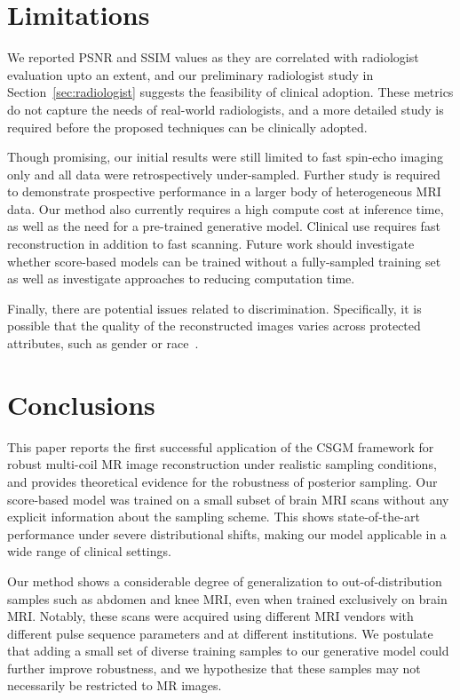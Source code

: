 \documentclass{article}
\begin{document}
\section{Limitations}\label{sec:limitations}
We reported PSNR and SSIM values as they are correlated with radiologist evaluation upto an extent, and our preliminary radiologist study in Section~\ref{sec:radiologist} suggests the feasibility of clinical adoption.
These metrics do not capture the needs of real-world radiologists, and a more detailed study is required before the proposed techniques can be clinically adopted. 

Though promising, our initial results were still limited to fast spin-echo imaging only and all data were retrospectively under-sampled. Further study is required to demonstrate prospective performance in a larger body of heterogeneous MRI data. Our method also currently requires a high compute cost at inference time, as well as the need for a pre-trained generative model. Clinical use requires fast reconstruction in addition to fast scanning. Future work should investigate whether score-based models can be trained without a fully-sampled training set as well as investigate approaches to reducing computation time.

Finally, there are potential issues related to discrimination. Specifically, it is possible that the quality of the reconstructed images varies across protected attributes, such as gender or race~\cite{larrazabal2020gender}.

\section{Conclusions}
This paper reports the first successful application of the CSGM framework for robust multi-coil MR image reconstruction under realistic sampling conditions, and provides theoretical evidence for the robustness of posterior sampling. Our score-based model was trained on a small subset of brain MRI scans without any explicit information about the sampling scheme. This shows state-of-the-art performance under severe distributional shifts, making our model applicable in a wide range of clinical settings. 

Our method shows a considerable degree of generalization to out-of-distribution samples such as abdomen and knee MRI, even when trained exclusively on brain MRI. Notably, these scans were acquired using different MRI vendors with different pulse sequence parameters and at different institutions. We postulate that adding a small set of diverse training samples to our generative model could further improve robustness, and we hypothesize that these samples may not necessarily be restricted to MR images.
\end{document}
